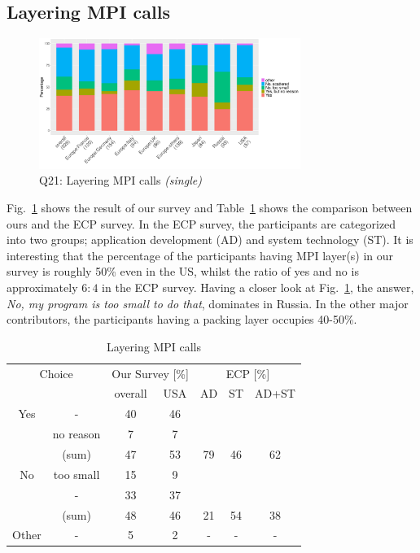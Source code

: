 \documentclass[preprint,5p,times]{elsarticle}
\def\myquote#1{{\it #1}}
\def\mcountries{major contributors}%
\begin{document}
\subsection{Layering MPI calls}\label{sec:mpi-calls}

\begin{figure}[htb]
  \begin{center}
    \includegraphics[width=8.5cm]{R-scripts/Q21.pdf}
    \caption{Q21: Layering MPI calls {\it(single)}}
    \label{fig:layering-mpi-calls}
  \end{center}
\end{figure}

Fig.~\ref{fig:layering-mpi-calls} shows the result of our survey and
Table~\ref{tab:layering-mpi-calls} shows the comparison between ours
and the ECP survey. In the ECP survey, the participants are categorized
into two groups; application development (AD) and system technology
(ST). It is interesting that the percentage of the participants having
MPI layer(s) in our survey is roughly 50\% even in the US, whilst the
ratio of yes and no is approximately $6:4$ in the ECP survey.
Having a closer look at Fig.~\ref{fig:layering-mpi-calls}, the answer,
\myquote{No, my program is too small to do that}, dominates in Russia. In
the other \mcountries, the participants having a packing layer occupies
40-50\%.

\begin{table}[htb]%
  \small%
  \begin{center}%
    \caption{Layering MPI calls}\label{tab:layering-mpi-calls}%
    \begin{tabular}{c|c||c|c||c|c|c}%
      \hline%
      \multicolumn{2}{c||}{Choice} & \multicolumn{2}{c||}{Our Survey [\%]} &
      \multicolumn{3}{c}{ECP [\%]} \\
      \cline{3-7}%
      \multicolumn{2}{c||}{} & overall & USA & AD & ST & AD+ST \\
      \hline%
      \hline%
      Yes & - & 40 & 46 & & & \\
      & no reason & 7 & 7 & & & \\
      \cline{2-4}%
      & (sum) & 47 & 53 &  79 & 46 & 62 \\
      \hline%
      \hline%
      No & too small & 15 & 9 & & & \\
      & - & 33 & 37 & & & \\
      \cline{2-4}%
      & (sum) & 48 & 46 & 21 & 54 & 38 \\
      \hline%
      \hline%
      Other & - & 5 & 2 & - & - & - \\
      \hline%
    \end{tabular}%
  \end{center}%
\end{table}%
\end{document}
